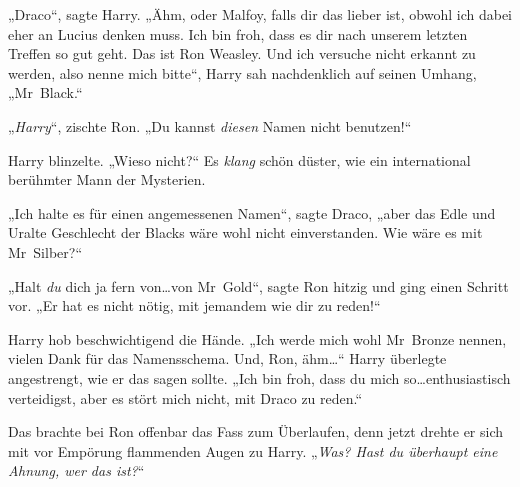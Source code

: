 „Draco“, sagte Harry. „Ähm, oder Malfoy, falls dir das lieber ist, obwohl ich dabei eher an Lucius denken muss. Ich bin froh, dass es dir nach unserem letzten Treffen so gut geht. Das ist Ron Weasley. Und ich versuche nicht erkannt zu werden, also nenne mich bitte“, Harry sah nachdenklich auf seinen Umhang, „Mr~Black.“

„\emph{Harry}“, zischte Ron. „Du kannst \emph{diesen} Namen nicht benutzen!“

Harry blinzelte. „Wieso nicht?“ Es \emph{klang} schön düster, wie ein international berühmter Mann der Mysterien.

„Ich halte es für einen angemessenen Namen“, sagte Draco, „aber das Edle und Uralte Geschlecht der Blacks wäre wohl nicht einverstanden. Wie wäre es mit Mr~Silber?“

„Halt \emph{du} dich ja fern von…von Mr~Gold“, sagte Ron hitzig und ging einen Schritt vor. „Er hat es nicht nötig, mit jemandem wie dir zu reden!“

Harry hob beschwichtigend die Hände. „Ich werde mich wohl Mr~Bronze nennen, vielen Dank für das Namensschema. Und, Ron, ähm…“ Harry überlegte angestrengt, wie er das sagen sollte. „Ich bin froh, dass du mich so…enthusiastisch verteidigst, aber es stört mich nicht, mit Draco zu reden.“

Das brachte bei Ron offenbar das Fass zum Überlaufen, denn jetzt drehte er sich mit vor Empörung flammenden Augen zu Harry. „\emph{Was? Hast du überhaupt eine \emph{Ahnung}, wer das ist?}“

